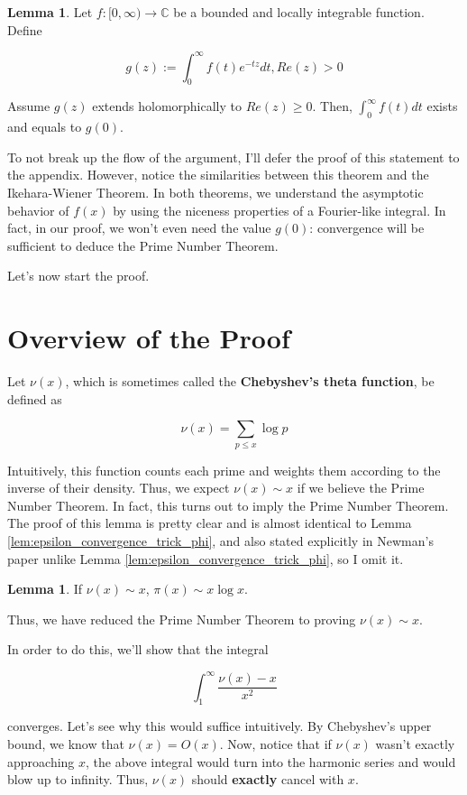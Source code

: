 \documentclass{article}
\theoremstyle{definition}
\newtheorem{lemma}[theorem]{Lemma}
\newcommand{\C}{\mathbb{C}}
\begin{document}
\begin{lemma}
    Let $ f:[0,\infty) \xrightarrow{} \C$ be a bounded and locally integrable function.
    Define 

    \[ g(z) := \int_{0}^{\infty} f(t) e^{-tz} dt, Re(z) > 0 \]

    Assume $ g(z) $ extends holomorphically to $ Re(z) \geq 0 $.
    Then, $ \int_{0}^{\infty} f(t) dt $ exists and equals to $ g(0) $.
\end{lemma}

To not break up the flow of the argument, I'll defer the proof of this statement to the appendix.
However, notice the similarities between this theorem and the Ikehara-Wiener Theorem.
In both theorems, we understand the asymptotic behavior of $ f(x) $ by using the
niceness properties of a Fourier-like integral. In fact, in our proof, we won't even need
the value $ g(0) $: convergence will be sufficient to deduce the Prime Number Theorem.

Let's now start the proof.

\section{Overview of the Proof}

Let $ \nu(x) $, which is sometimes called the \textbf{Chebyshev's theta function},
be defined as 

\[ \nu(x) = \sum_{p \leq x} \log p \]

Intuitively, this function
counts each prime and weights them according to the inverse of their density.
Thus, we expect $ \nu(x) \sim x $ if we believe the Prime Number Theorem.
In fact, this turns out to imply the Prime Number Theorem. The proof of this
lemma is pretty clear and is almost identical to Lemma \ref{lem:epsilon_convergence_trick_phi},
and also stated explicitly in Newman's paper unlike Lemma \ref{lem:epsilon_convergence_trick_phi},
so I omit it.

\begin{lemma}
    If $ \nu(x) \sim x $, $ \pi(x) \sim x \log x $.
\end{lemma}

Thus, we have reduced the Prime Number Theorem to proving $ \nu(x) \sim x $.

In order to do this, we'll show that the integral 

\[ \int_{1}^{\infty} \frac{\nu(x) - x}{x^{2}} \]

converges. Let's see why this would suffice intuitively. By Chebyshev's upper bound,
we know that $ \nu(x) = O(x) $. Now, notice that if $ \nu(x) $ wasn't exactly approaching $ x $,
the above integral would turn into the harmonic series and would blow up to infinity. Thus, $ \nu(x) $ should 
\textbf{exactly} cancel with $ x $. 
\end{document}
